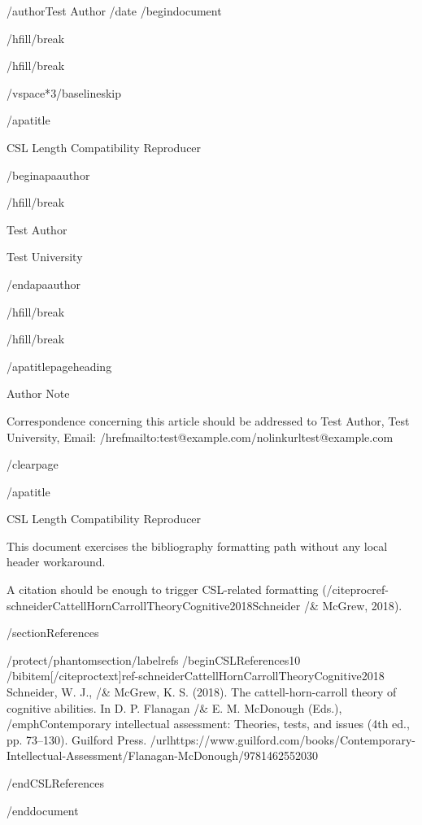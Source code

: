/author{Test Author}
/date{}
/begin{document}


/hfill/break

/hfill/break

/vspace*{3/baselineskip}

/apatitle{

CSL Length Compatibility Reproducer

}

/begin{apaauthor}

/hfill/break

Test Author

Test University

/end{apaauthor}

/hfill/break

/hfill/break

/apatitlepageheading{

Author Note

}

Correspondence concerning this article should be addressed to Test
Author, Test University, Email:
/href{mailto:test@example.com}{/nolinkurl{test@example.com}}

/clearpage

/apatitle{

CSL Length Compatibility Reproducer

}

This document exercises the bibliography formatting path without any
local header workaround.

A citation should be enough to trigger CSL-related formatting
(/citeproc{ref-schneiderCattellHornCarrollTheoryCognitive2018}{Schneider
/& McGrew, 2018}).

/section{References}

/protect/phantomsection/label{refs}
/begin{CSLReferences}{1}{0}
/bibitem[/citeproctext]{ref-schneiderCattellHornCarrollTheoryCognitive2018}
Schneider, W. J., /& McGrew, K. S. (2018). The cattell-horn-carroll
theory of cognitive abilities. In D. P. Flanagan /& E. M. McDonough
(Eds.), /emph{Contemporary intellectual assessment: Theories, tests, and
issues} (4th ed., pp. 73--130). Guilford Press.
/url{https://www.guilford.com/books/Contemporary-Intellectual-Assessment/Flanagan-McDonough/9781462552030}

/end{CSLReferences}




/end{document}
